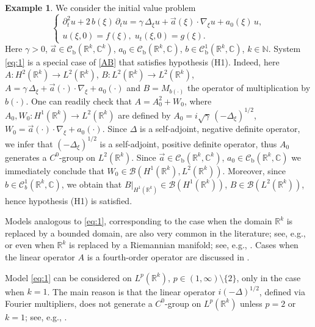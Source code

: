 \documentclass[11pt]{amsart}
\numberwithin{equation}{section}
\newcommand\R{\mathbb R}
\newcommand\C{\mathbb C}
\newcommand{\RR}{{\mathbb R}}
\newcommand{\NN}{{\mathbb N}}
\newcommand{\rmb}{{\mathrm{b}}}
\theoremstyle{remark}
\theoremstyle{definition}
\newtheorem{example}[theorem]{Example}
\newcommand\cC{{\mathcal C}}
\begin{document}
\begin{example}\label{e8.1}
	We consider the initial value problem
	\begin{equation}\label{eq:1}
		\begin{cases}
			\partial_t^2 u + 2\,b(\xi)\,\partial_t u = \gamma\,\Delta_\xi u + \vec{a}(\xi)\cdot\nabla_\xi u + a_0(\xi)\,u,\\
			u(\xi,0) = f(\xi),\; u_t(\xi,0) = g(\xi).
		\end{cases}
	\end{equation}
	Here $\gamma > 0$, $\vec{a} \in \cC_\rmb(\R^k,\C^k)$, $a_0 \in \cC_\rmb(\R^k,\C)$,
	$b \in \cC^1_\rmb(\R^k,\C)$, $k\in\NN$. System \eqref{eq:1} is a special case of \eqref{AB} that satisfies hypothesis (H1). Indeed, here $A: H^2(\R^k) \to L^2(\R^k)$,
	$B: L^2(\R^k) \to L^2(\R^k)$,
	$A = \gamma\,\Delta_\xi + \vec{a}(\cdot)\cdot\nabla_\xi + a_0(\cdot)$ and $B=M_{b(\cdot)}$ the operator of
	multiplication by $b(\cdot)$. One can readily check that $A = A_0^2 + W_0$, where
	$A_0, W_0: H^1(\R^k) \to L^2(\R^k)$ are defined by
	$A_0 = i\sqrt{\gamma}\,(-\Delta_\xi)^{1/2}$, $W_0 = \vec{a}(\cdot)\cdot\nabla_\xi + a_0(\cdot)$. Since $\Delta$ is a self-adjoint, negative definite operator, we infer that $(-\Delta_\xi)^{1/2}$
	is a self-adjoint, positive definite operator, thus $A_0$ generates a $C^0$-group on
	$L^2(\R^k)$. Since $\vec{a} \in \mathcal{C}_\rmb(\R^k,\C^k)$, $a_0 \in \mathcal{C}_\rmb(\R^k,\C)$ we
	immediately conclude that $W_0 \in \mathcal{B}(H^1(\R^k), L^2(\R^k))$. Moreover, since
	$b \in \mathcal{C}^1_b(\R^k,\C)$, we obtain that $B\big|_{H^1(\R^k)} \in \mathcal{B}(H^1(\R^k))$,
	$B \in \mathcal{B}(L^2(\R^k))$, hence hypothesis (H1) is satisfied. 
\end{example}
Models analogous to \eqref{eq:1}, corresponding to the case when the domain $\R^k$ is replaced
by a bounded domain, are also very common in the literature; see, e.g., \cite{BH,CST1, CPSST,CZ,GH,KLT,OZP}
or even when $\RR^k$ is replaced by a Riemannian
manifold; see, e.g., \cite{AL,L}. Cases when the linear operator $A$ is a fourth-order operator are discussed in \cite{Soba}.

Model \eqref{eq:1} can be considered on $L^p(\R^k)$, $p \in (1,\infty)\setminus\{2\}$,
only in the case when $k=1$. The main reason is that the linear operator $i(-\Delta)^{1/2}$,
defined via Fourier multipliers, does not generate a $C^0$-group on $L^p(\R^k)$ unless $p=2$ or $k=1$; see, e.g.,
\cite{Sogge,Stein,Taylor}.
\end{document}
